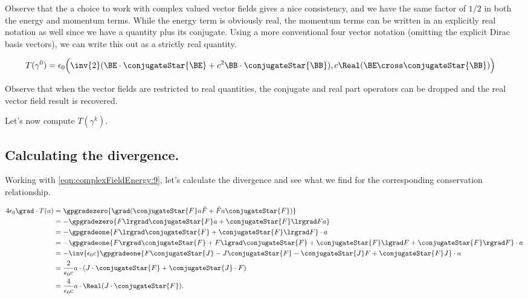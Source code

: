 Observe that the a choice to work with complex valued vector fields gives a nice consistency, and we have the same factor of $1/2$ in both the energy and momentum terms.  While the energy term is obviously real, the momentum terms can be written in an explicitly real notation as well since we have a quantity plus its conjugate.  Using a more conventional four vector notation (omitting the explicit Dirac basis vectors), we can write this out as a strictly real quantity.

\begin{align}\label{eqn:complexFieldEnergy:21}
T(\gamma^0) 
&=
\epsilon_0
\Bigl( \inv{2}(\BE \cdot \conjugateStar{\BE} + c^2 \BB \cdot \conjugateStar{\BB}),
c \Real( \BE \cross \conjugateStar{\BB} ) \Bigr)
\end{align}

Observe that when the vector fields are restricted to real quantities, the conjugate and real part operators can be dropped and the real vector field result is recovered.

Let's now compute $T(\gamma^k)$.

\subsection{Calculating the divergence.}

Working with \ref{eqn:complexFieldEnergy:9}, let's calculate the divergence and see what we find for the corresponding conservation relationship.

\begin{align*}
4 \epsilon_0 \grad \cdot T(a) 
&=
\gpgradezero{ \grad ( \conjugateStar{F} a \tilde{F} + \tilde{F} a \conjugateStar{F} )} \\
&=
-\gpgradezero{ F \lrgrad \conjugateStar{F} a + \conjugateStar{F} \lrgrad F a } \\
&=
-\gpgradeone{ F \lrgrad \conjugateStar{F} + \conjugateStar{F} \lrgrad F } \cdot a \\
&=
-\gpgradeone{ 
F \rgrad \conjugateStar{F} 
+F \lgrad \conjugateStar{F} 
+ \conjugateStar{F} \lgrad F
+ \conjugateStar{F} \rgrad F
} \cdot a \\
&=
-\inv{\epsilon_0 c} \gpgradeone{ 
F \conjugateStar{J} 
- J \conjugateStar{F} 
- \conjugateStar{J} F
+ \conjugateStar{F} J
} \cdot a \\
&= \frac{2}{\epsilon_0 c} a \cdot ( 
J \cdot \conjugateStar{F} 
+ \conjugateStar{J} \cdot F
) \\
&= \frac{4}{\epsilon_0 c} a \cdot \Real ( J \cdot \conjugateStar{F} ).
\end{align*}

